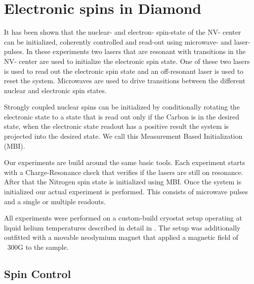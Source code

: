 \chapter{Electronic spins in Diamond}
\label{controlingspinsindiamond}




It has been shown that the nuclear- and electron- spin-state of the NV- center can be initialized, coherently controlled and read-out using microwave- and laser- pulses\citep{Robledo2011HighFidelity}. In these experiments two lasers that are resonant with transitions in the NV- center are used to initialize the electronic spin state. One of these two lasers is used to read out the electronic spin state and an off-resonant laser is used to reset the system.  Microwaves are used to drive transitions between the different nuclear and electronic spin states.

Strongly coupled nuclear spins can be initialized by conditionally rotating the electronic state to a state that is read out only if the Carbon is in the desired state, when the electronic state readout has a positive result the system is projected into the desired state. We call this Measurement Based Initialization (MBI).

Our experiments are build around the same basic tools. Each experiment starts with a Charge-Resonance check that verifies if the lasers are still on resonance. After that the Nitrogen spin state is initialized using MBI. Once the system is initialized our actual experiment is performed. This consists of microwave pulses and a single or multiple readouts.

All experiments were performed on a custom-build cryostat setup operating at liquid helium temperatures described in detail in \citet[chap.~3]{Bernien2014Control}. The setup was additionally outfitted with a movable neodymium magnet that applied a magnetic field of ~300G to the sample.

\section{Spin Control}
\label{spincontrol}

